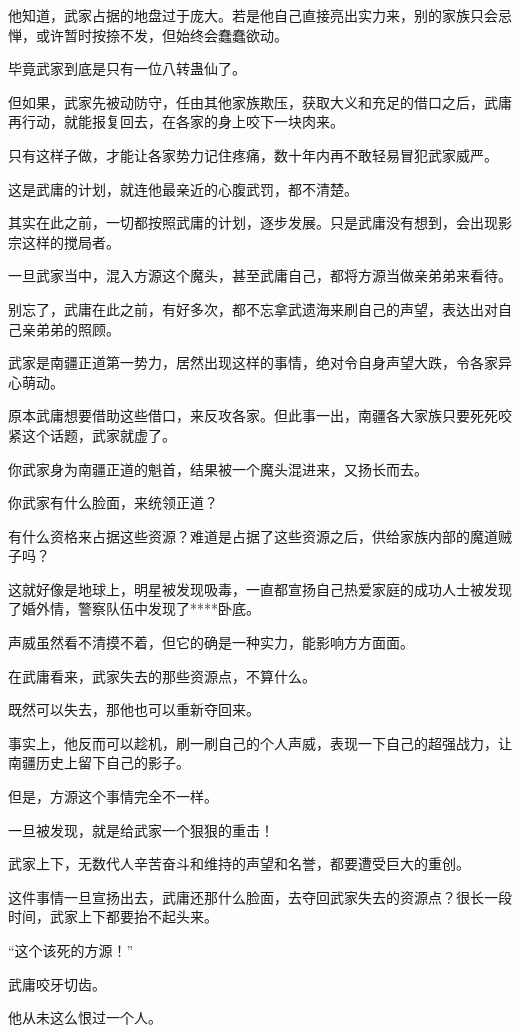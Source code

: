 \begin{this_body}
他知道，武家占据的地盘过于庞大。若是他自己直接亮出实力来，别的家族只会忌惮，或许暂时按捺不发，但始终会蠢蠢欲动。

毕竟武家到底是只有一位八转蛊仙了。

但如果，武家先被动防守，任由其他家族欺压，获取大义和充足的借口之后，武庸再行动，就能报复回去，在各家的身上咬下一块肉来。

只有这样子做，才能让各家势力记住疼痛，数十年内再不敢轻易冒犯武家威严。

这是武庸的计划，就连他最亲近的心腹武罚，都不清楚。

其实在此之前，一切都按照武庸的计划，逐步发展。只是武庸没有想到，会出现影宗这样的搅局者。

一旦武家当中，混入方源这个魔头，甚至武庸自己，都将方源当做亲弟弟来看待。

别忘了，武庸在此之前，有好多次，都不忘拿武遗海来刷自己的声望，表达出对自己亲弟弟的照顾。

武家是南疆正道第一势力，居然出现这样的事情，绝对令自身声望大跌，令各家异心萌动。

原本武庸想要借助这些借口，来反攻各家。但此事一出，南疆各大家族只要死死咬紧这个话题，武家就虚了。

你武家身为南疆正道的魁首，结果被一个魔头混进来，又扬长而去。

你武家有什么脸面，来统领正道？

有什么资格来占据这些资源？难道是占据了这些资源之后，供给家族内部的魔道贼子吗？

这就好像是地球上，明星被发现吸毒，一直都宣扬自己热爱家庭的成功人士被发现了婚外情，警察队伍中发现了****卧底。

声威虽然看不清摸不着，但它的确是一种实力，能影响方方面面。

在武庸看来，武家失去的那些资源点，不算什么。

既然可以失去，那他也可以重新夺回来。

事实上，他反而可以趁机，刷一刷自己的个人声威，表现一下自己的超强战力，让南疆历史上留下自己的影子。

但是，方源这个事情完全不一样。

一旦被发现，就是给武家一个狠狠的重击！

武家上下，无数代人辛苦奋斗和维持的声望和名誉，都要遭受巨大的重创。

这件事情一旦宣扬出去，武庸还那什么脸面，去夺回武家失去的资源点？很长一段时间，武家上下都要抬不起头来。

“这个该死的方源！”

武庸咬牙切齿。

他从未这么恨过一个人。


\end{this_body}
